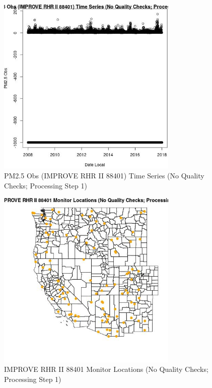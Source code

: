 
\begin{figure} 
\centering  
\includegraphics[width=0.77\textwidth]{Code_Outputs/PM25Source6TSstep1_PM25_ObsvDate_Local.jpg} 
\caption{\label{fig:PM25Source6TSstep1PM25_ObsvDate_Local}PM2.5 Obs (IMPROVE RHR II 88401) Time Series (No Quality Checks; Processing Step 1)} 
\end{figure} 
 

\begin{figure} 
\centering  
\includegraphics[width=0.77\textwidth]{Code_Outputs/PM25Source6TSstep1_MapIMPRHRII88401Locations.jpg} 
\caption{\label{fig:PM25Source6TSstep1MapIMPRHRII88401Locations}IMPROVE RHR II 88401 Monitor Locations (No Quality Checks; Processing Step 1)} 
\end{figure} 
 

